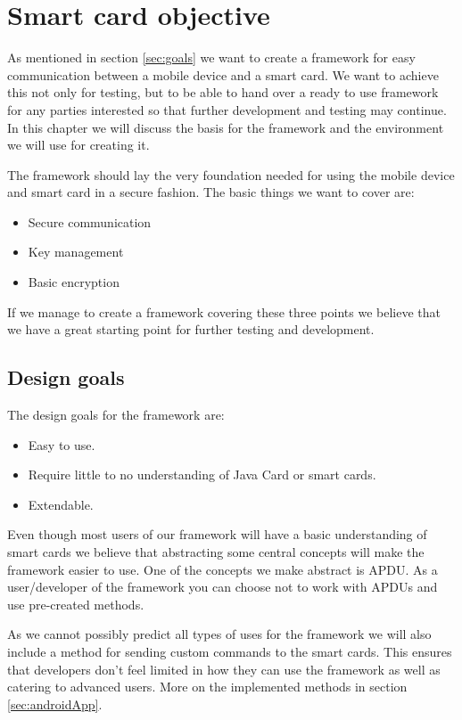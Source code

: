 \chapter{Smart card objective}
As mentioned in section \ref{sec:goals} we want to create a framework for easy communication between a mobile device and a smart card. We want to achieve this not only for testing, but to be able to hand over a ready to use framework for any parties interested so that further development and testing may continue. In this chapter we will discuss the basis for the framework and the environment we will use for creating it.

The framework should lay the very foundation needed for using the mobile device and smart card in a secure fashion. The basic things we want to cover are:
\begin{itemize}
    \item Secure communication
    \item Key management
    \item Basic encryption
\end{itemize}
If we manage to create a framework covering these three points we believe that we have a great starting point for further testing and development.

\section{Design goals}
\label{sec:designAndroidGoals}
The design goals for the framework are:

\begin{itemize}
    \item Easy to use.
    \item Require little to no understanding of Java Card or smart cards.
    \item Extendable.
\end{itemize}

Even though most users of our framework will have a basic understanding of smart cards we believe that abstracting some central concepts will make the framework easier to use. One of the concepts we make abstract is APDU. As a user/developer of the framework you can choose not to work with APDUs and use pre-created methods.

As we cannot possibly predict all types of uses for the framework we will also include a method for sending custom commands to the smart cards. This ensures that developers don't feel limited in how they can use the framework as well as catering to advanced users. More on the implemented methods in section \ref{sec:androidApp}.

